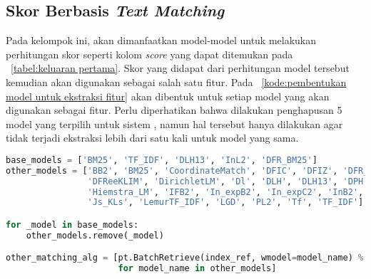 \subsection{Skor Berbasis \textit{Text Matching}}
\label{subbab:4:Ekstraksi Fitur:Text Matching Score}

Pada kelompok ini, akan dimanfaatkan model-model \base{} \retriever{} untuk melakukan perhitungan skor seperti kolom \textit{score} yang dapat ditemukan pada \tabel{}~\ref{tabel:keluaran pertama}. Skor yang didapat dari perhitungan model tersebut kemudian akan digunakan sebagai salah satu fitur. Pada \kode{}~\ref{kode:pembentukan model untuk ekstraksi fitur} akan dibentuk \pipeline{} untuk setiap model \base{} \retriever{} yang akan digunakan sebagai fitur. Perlu diperhatikan bahwa dilakukan penghapusan 5 model \base{} \retriever{} yang terpilih untuk sistem \ir{}, namun hal tersebut hanya dilakukan agar tidak terjadi ekstraksi lebih dari satu kali untuk model yang sama.
\begin{lstlisting}[language=Python, caption={\Pipeline{} ekstraksi fitur skor \base{} \retriever{}}, label={kode:pembentukan model untuk ekstraksi fitur}]
base_models = ['BM25', 'TF_IDF', 'DLH13', 'InL2', 'DFR_BM25']
other_models = ['BB2', 'BM25', 'CoordinateMatch', 'DFIC', 'DFIZ', 'DFR_BM25', 'DFRee',
                'DFReeKLIM', 'DirichletLM', 'Dl', 'DLH', 'DLH13', 'DPH', 'XSqrA_M',
                'Hiemstra_LM', 'IFB2', 'In_expB2', 'In_expC2', 'InB2', 'InL2',
                'Js_KLs', 'LemurTF_IDF', 'LGD', 'PL2', 'Tf', 'TF_IDF']

for _model in base_models:
    other_models.remove(_model) 

other_matching_alg = [pt.BatchRetrieve(index_ref, wmodel=model_name) % cut_off
                      for model_name in other_models]
\end{lstlisting}

